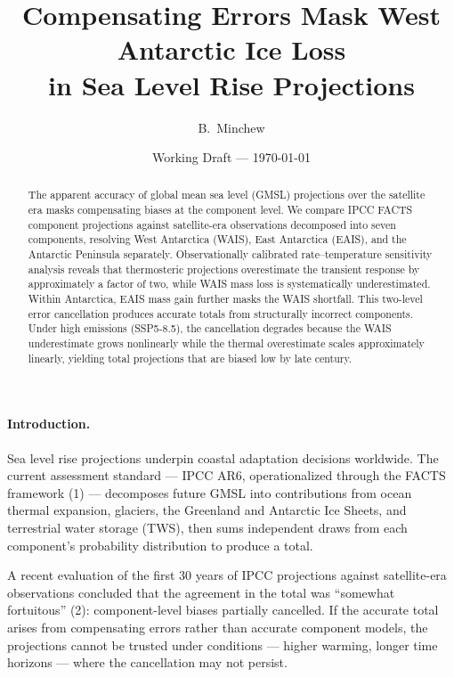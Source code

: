 \documentclass[11pt]{article}
\title{Compensating Errors Mask West Antarctic Ice Loss\\
  in Sea Level Rise Projections}
\author{B.\ Minchew}
\date{Working Draft --- \today}
\begin{document}
\maketitle

\begin{abstract}
The apparent accuracy of global mean sea level (GMSL) projections over the satellite era masks compensating biases at the component level.
We compare IPCC FACTS component projections against satellite-era observations decomposed into seven components, resolving West Antarctica (WAIS), East Antarctica (EAIS), and the Antarctic Peninsula separately.
Observationally calibrated rate--temperature sensitivity analysis reveals that thermosteric projections overestimate the transient response by approximately a factor of two, while WAIS mass loss is systematically underestimated.
Within Antarctica, EAIS mass gain further masks the WAIS shortfall.
This two-level error cancellation produces accurate totals from structurally incorrect components.
Under high emissions (SSP5-8.5), the cancellation degrades because the WAIS underestimate grows nonlinearly while the thermal overestimate scales approximately linearly, yielding total projections that are biased low by late century.
\end{abstract}



\paragraph{Introduction.}

Sea level rise projections underpin coastal adaptation decisions worldwide.  The current assessment standard --- IPCC AR6, operationalized through the FACTS framework (1) --- decomposes future GMSL into contributions from ocean thermal expansion, glaciers, the Greenland and Antarctic Ice Sheets, and terrestrial water storage (TWS), then sums independent draws from each component's probability distribution to produce a total.

A recent evaluation of the first 30 years of IPCC projections against satellite-era observations concluded that the agreement in the total was ``somewhat fortuitous'' (2): component-level biases partially cancelled.  If the accurate total arises from compensating errors rather than accurate component models, the projections cannot be trusted under conditions --- higher warming, longer time horizons --- where the cancellation may not persist.
\end{document}
